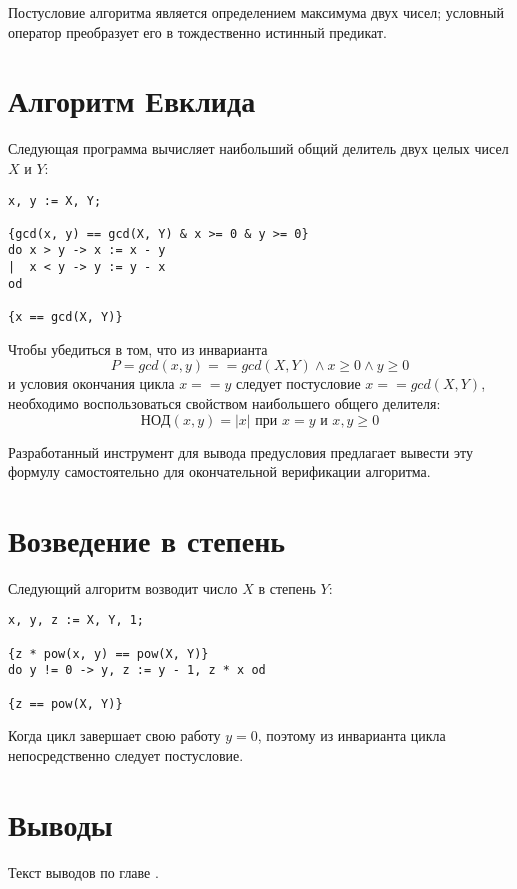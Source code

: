 Постусловие алгоритма является определением максимума двух чисел; условный оператор преобразует его 
в тождественно истинный предикат. 

\section{Алгоритм Евклида}
Следующая программа вычисляет наибольший общий делитель двух целых чисел $X$ и $Y$:
\begin{BVerbatim}
x, y := X, Y;

{gcd(x, y) == gcd(X, Y) & x >= 0 & y >= 0}
do x > y -> x := x - y
|  x < y -> y := y - x
od

{x == gcd(X, Y)}
\end{BVerbatim}

Чтобы убедиться в том, что из инварианта
\begin{equation}
    P = gcd(x, y) == gcd(X, Y) \wedge x \geq 0 \wedge y \geq 0
\end{equation}
и условия окончания цикла $x == y$ следует постусловие $x == gcd(X, Y)$, необходимо
воспользоваться свойством наибольшего общего делителя:
\begin{equation}
    НОД(x, y) = |x|\text{ при } x = y\text{ и }x, y \geq 0
\end{equation}

Разработанный инструмент для вывода предусловия предлагает вывести эту формулу самостоятельно для 
окончательной верификации алгоритма.

\section{Возведение в степень}
Следующий алгоритм возводит число $X$ в степень $Y$:
\begin{BVerbatim}
x, y, z := X, Y, 1;

{z * pow(x, y) == pow(X, Y)}
do y != 0 -> y, z := y - 1, z * x od

{z == pow(X, Y)}
\end{BVerbatim} 

Когда цикл завершает свою работу $y = 0$, поэтому из инварианта цикла непосредственно следует постусловие.
\section{Выводы} \label{ch4:conclusion}
Текст выводов по главе \thechapter.

%
